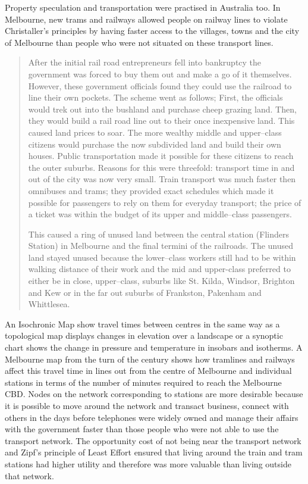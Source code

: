 Property speculation and transportation were practised in Australia too. In Melbourne, new trams and railways allowed people on railway lines to violate Christaller's principles by having faster access to the villages, towns and the city of Melbourne than people who were not situated on these transport lines.

\begin{quotation}
After the initial rail road entrepreneurs fell into bankruptcy the government was forced to buy them out and make a go of it themselves. However, these government officials found they could use the railroad to line their own
pockets. The scheme went as follows; First, the officials would trek out into the bushland and purchase cheep grazing land. Then, they would build a rail road line out to their once inexpensive land. This caused land prices to soar. The more wealthy middle and upper--class citizens would purchase the now subdivided land and build their own houses. Public transportation made it possible for these citizens to reach the outer suburbs. Reasons for this were threefold: transport time in and out of the city was now very small. Train transport was much faster then omnibuses and trams; they provided exact schedules which made it possible for passengers to rely on them for everyday transport; the price of a ticket was within the budget of its upper and middle--class passengers.

This caused a ring of unused land between the central station (Flinders Station) in Melbourne and the final termini of the railroads. The unused land stayed unused because the lower--class workers still had to be within walking distance of their work and the mid and upper-class preferred to either be in close, upper--class, suburbs like St. Kilda, Windsor, Brighton and Kew or in the far out suburbs of Frankston, Pakenham and Whittlesea\cite{RefWorks:306}.
\end{quotation}

An Isochronic Map show travel times between centres in the same way as a topological map displays changes in elevation over a landscape or a synoptic chart shows the change in pressure and temperature in insobars and isotherms. A Melbourne map from the turn of the century shows how tramlines and railways affect this travel time in lines out from the centre of Melbourne and individual stations in terms of the number of minutes required to reach the Melbourne CBD. Nodes on the network corresponding to stations are more desirable because it is possible to move around the network and transact business, connect with others in the days before telephones were widely owned and manage their affairs with the government faster than those people who were not able to use the transport network. The opportunity cost of not being near the transport network and Zipf's principle of Least Effort ensured that living around the train and tram stations had higher utility and therefore was more valuable than living outside that network. 



